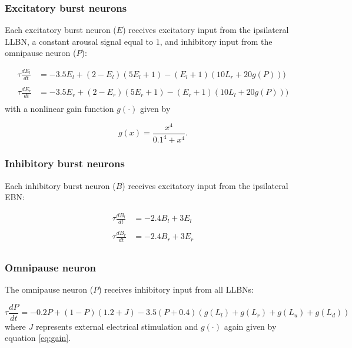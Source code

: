 \documentclass[10pt,a4paper,onecolumn]{article}
\begin{document}
\subsubsection{Excitatory burst neurons}\label{excitatory-burst-neurons}

Each excitatory burst neuron (\(E\)) receives excitatory input from the
ipsilateral LLBN, a constant arousal signal equal to \(1\), and
inhibitory input from the omnipause neuron (\(P\)):

\begin{equation}
\begin{array}{ll}
\tau\frac{dE_l}{dt} &= -3.5E_l+(2-E_l)(5E_l+1)-(E_l+1)(10L_r+20g(P))) \\\\
\tau\frac{dE_r}{dt} &= -3.5E_r+(2-E_r)(5E_r+1)-(E_r+1)(10L_l+20g(P))) \\
\end{array}
\label{eq:ebn}\end{equation} with a nonlinear gain function \(g(\cdot)\)
given by

\begin{equation}
g(x) = \frac{x^4}{0.1^4+x^4} \textrm{.}
\label{eq:gain}\end{equation}

\subsubsection{Inhibitory burst neurons}\label{inhibitory-burst-neurons}

Each inhibitory burst neuron (\(B\)) receives excitatory input from the
ipsilateral EBN:

\begin{equation}
\begin{array}{ll}
\tau\frac{dB_l}{dt} &= -2.4B_l+3E_l \\\\
\tau\frac{dB_r}{dt} &= -2.4B_r+3E_r \\
\end{array}
\label{eq:ibn}\end{equation}

\subsubsection{Omnipause neuron}\label{omnipause-neuron}

The omnipause neuron (\(P\)) receives inhibitory input from all LLBNs:

\begin{equation}
\tau\frac{dP}{dt} = -0.2P+(1-P)(1.2+J)-3.5(P+0.4)(g(L_l)+g(L_r)+g(L_u)+g(L_d))
\label{eq:opn}\end{equation} where \(J\) represents external electrical
stimulation and \(g(\cdot)\) again given by equation \ref{eq:gain}.
\end{document}
